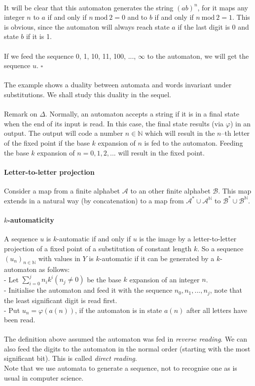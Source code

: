 \documentclass{article}
\begin{document}
\\
It will be clear that this automaton generates the string $(ab)^n$, for it
maps any integer $n$ to $a$ if and only if $n \mathrm{\ mod\ } 2 = 0$ and to
$b$ if and only if $n \mathrm{\ mod\ } 2 = 1$. This is obvious, since the
automaton will always reach state $a$ if the last digit is 0 and state $b$ 
if it is 1.\\
\\
If we feed the sequence 0, 1, 10, 11, 100, ..., $\infty$ to the automaton,
we will get the sequence $u$. $\square$\\
\\
The example shows a duality between automata and words invariant under 
substitutions. We shall study this duality in the sequel.\\
\\
Remark on $\Delta$. Normally, an automaton accepts a string if it is in
a final state when the end of its input is read. In this case, the final state
results (via $\varphi$) in an output. The output will code a number
$n \in \mathbb{N}$ which will result in the $n$--th letter of the fixed point
if the base $k$ expansion of $n$ is fed to the automaton. Feeding the base
$k$ expansion of $n = 0, 1, 2, ...$ will result in the fixed point.

\paragraph{Letter-to-letter projection} Consider a map from a finite alphabet
$\mathcal{A}$ to an other finite alphabet $\mathcal{B}$. This map extends in
a natural way (by concatenation) to a map from
$\mathcal{A}^* \cup \mathcal{A}^\mathbb{N}$ to
$\mathcal{B}^* \cup \mathcal{B}^\mathbb{N}$.

\paragraph{$k$-automaticity} A sequence $u$ is $k$-automatic if and only if
$u$ is the image by a letter-to-letter projection of a fixed point of a
substitution of constant length $k$. So a sequence $(u_n)_{n \in \mathbb{N}}$
with values in $Y$ is $k$-automatic if it can be generated by a $k$-automaton
as follows:\\
- Let $\sum_{i=0}^j n_i k^i (n_j \neq 0)$ be the base $k$ expansion of an
  integer $n$.\\
- Initialise the automaton and feed it with the sequence $n_0, n_1, ..., n_j$,
  note that the least significant digit is read first.\\
- Put $u_n = \varphi(a(n))$, if the automaton is in state $a(n)$ after all 
letters have been read.\\
\\
The definition above assumed the automaton was fed in \emph{reverse reading}.
We can also feed the digits to the automaton in the normal order (starting with
the most significant bit). This is called \emph{direct reading}.\\
Note that we use automata to generate a sequence, not to recognise one as is
usual in computer science.
\end{document}
